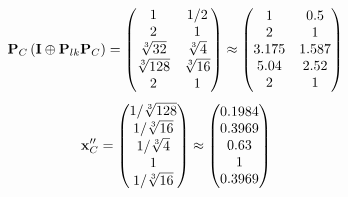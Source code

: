 \documentclass[10pt,a4paper]{article}
\begin{document}
	\[
		\bold{P}_{C}\left(\bold{I} \oplus \bold{P}_{lk}\bold{P}_{C}\right) = 
		\begin{pmatrix}
			{1}{} & {1} / {{2}} \\
			{{2}}{} & {1}{} \\
			{\sqrt[3]{32}}{} & {\sqrt[3]{4}}{} \\
			{\sqrt[3]{128}}{} & {\sqrt[3]{16}}{} \\
			{{2}}{} & {1}{} \\
		\end{pmatrix}
		\approx
		\begin{pmatrix}
			1        & 0.5      \\
			2        & 1        \\
			3.175    & 1.587    \\
			5.04     & 2.52     \\
			2        & 1        \\
		\end{pmatrix}
	\]
	\[
		\bold{x}''_{C} = 
		\begin{pmatrix}
			{1} / {\sqrt[3]{128}} \\
			{1} / {\sqrt[3]{16}} \\
			{1} / {\sqrt[3]{4}} \\
			{1}{} \\
			{1} / {\sqrt[3]{16}} \\
		\end{pmatrix}
		\approx
		\begin{pmatrix}
			0.1984   \\
			0.3969   \\
			0.63     \\
			1        \\
			0.3969   \\
		\end{pmatrix}
	\]
\end{document}
